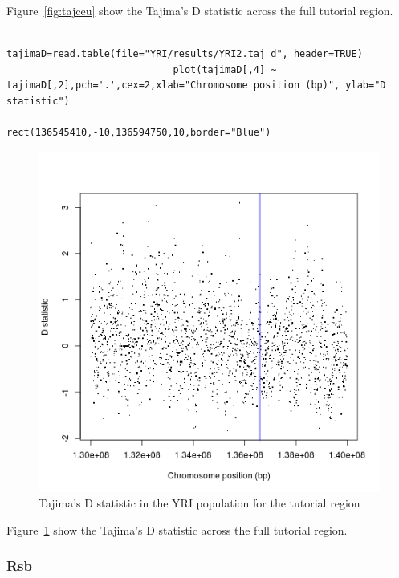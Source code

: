 \documentclass[a4paper,10pt]{article}
\begin{document}
                             \noindent
                             Figure~\ref{fig:tajceu} show the Tajima's D statistic across the full tutorial region.

                             \begin{verbatim}
                             tajimaD=read.table(file="YRI/results/YRI2.taj_d", header=TRUE)
                             plot(tajimaD[,4] ~ tajimaD[,2],pch='.',cex=2,xlab="Chromosome position (bp)", ylab="D statistic")
                             rect(136545410,-10,136594750,10,border="Blue") 
                             \end{verbatim}

                             \begin{figure}
                             \centering
                             \includegraphics{pictures/YRItajimas.png}
                             \caption{Tajima's D statistic in the YRI population for the tutorial region} 
                             \label{fig:tajyri}
                             \end{figure}

                             \noindent
                             Figure~\ref{fig:tajyri} show the Tajima's D statistic across the full tutorial region.

                             \subsubsection{Rsb}
\end{document}
